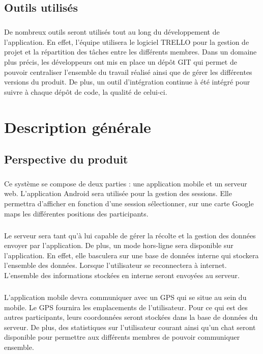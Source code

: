\documentclass[titlepage, 12pt]{report}
\begin{document}
\section{Outils utilisés}

\paragraph{}De nombreux outils seront utilisés tout au long du développement de l'application. En effet, l'équipe utilisera le logiciel TRELLO pour la gestion de projet et la répartition des tâches entre les différents membres. Dans un domaine plus précis, les développeurs ont mis en place un dépôt GIT qui permet de pouvoir centraliser l'ensemble du travail réalisé ainsi que de gérer les différentes versions du produit. De plus, un outil d'intégration continue à été intégré pour suivre à chaque dépôt de code, la qualité de celui-ci.

\chapter{Description générale}

\section{Perspective du produit}

\paragraph{}Ce système se compose de deux parties : une application mobile et un serveur web.
L'application Android sera utilisée pour la gestion des sessions. Elle permettra d'afficher en fonction d'une session sélectionner, sur une carte Google maps les différentes positions des participants.
\paragraph{}Le serveur sera tant qu'à lui capable de gérer la récolte et la gestion des données envoyer par l'application.
De plus, un mode hors-ligne sera disponible sur l'application. En effet, elle basculera sur une base de données interne qui stockera l'ensemble des données. Lorsque l'utilisateur se reconnectera à internet. L'ensemble des informations stockées en interne seront envoyées au serveur.
\paragraph{}L'application mobile devra communiquer avec un GPS qui se situe au sein du mobile. Le GPS fournira les emplacements de l'utilisateur. Pour ce qui est des autres participants, leurs coordonnées seront stockées dans la base de données du serveur. De plus, des statistiques sur l'utilisateur courant ainsi qu'un chat seront disponible pour permettre aux différents membres de pouvoir communiquer ensemble.
\end{document}
